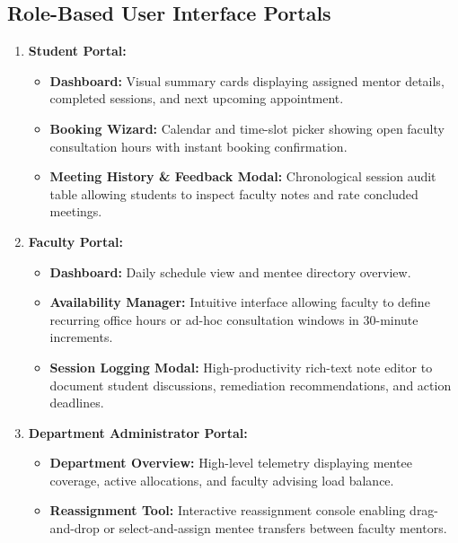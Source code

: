 \documentclass[11pt,a4paper]{article}
\begin{document}
\subsection{Role-Based User Interface Portals}
\begin{enumerate}[leftmargin=1.4em, itemsep=0.3em]
  \item \textbf{Student Portal:}
  \begin{itemize}
    \item \textbf{Dashboard:} Visual summary cards displaying assigned mentor details, completed sessions, and next upcoming appointment.
    \item \textbf{Booking Wizard:} Calendar and time-slot picker showing open faculty consultation hours with instant booking confirmation.
    \item \textbf{Meeting History \& Feedback Modal:} Chronological session audit table allowing students to inspect faculty notes and rate concluded meetings.
  \end{itemize}
  \item \textbf{Faculty Portal:}
  \begin{itemize}
    \item \textbf{Dashboard:} Daily schedule view and mentee directory overview.
    \item \textbf{Availability Manager:} Intuitive interface allowing faculty to define recurring office hours or ad-hoc consultation windows in 30-minute increments.
    \item \textbf{Session Logging Modal:} High-productivity rich-text note editor to document student discussions, remediation recommendations, and action deadlines.
  \end{itemize}
  \item \textbf{Department Administrator Portal:}
  \begin{itemize}
    \item \textbf{Department Overview:} High-level telemetry displaying mentee coverage, active allocations, and faculty advising load balance.
    \item \textbf{Reassignment Tool:} Interactive reassignment console enabling drag-and-drop or select-and-assign mentee transfers between faculty mentors.
  \end{itemize}
\end{enumerate}

\end{document}

